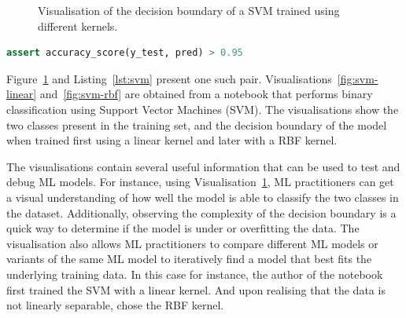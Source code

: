 \documentclass[conference]{IEEEtran}
\begin{document}
\begin{figure}
  \hfill
  \caption{Visualisation of the decision boundary of a SVM trained using different kernels.}\label{fig:svm}
\end{figure}

\begin{lstlisting}[language=Python, caption={Assertion on the accuracy of the ML model.}, label={lst:svm}]
assert accuracy_score(y_test, pred) > 0.95
\end{lstlisting}

Figure~\ref{fig:svm} and Listing~\ref{lst:svm} present one such pair. Visualisations~\ref{fig:svm-linear} and~\ref{fig:svm-rbf} are obtained from a notebook that performs binary classification using Support Vector Machines (SVM). The visualisations show the two classes present in the training set, and the decision boundary of the model when trained first using a linear kernel and later with a RBF kernel.

The visualisations contain several useful information that can be used to test and debug ML models. For instance, using Visualisation~\ref{fig:svm}, ML practitioners can get a visual understanding of how well the model is able to classify the two classes in the dataset. Additionally, observing the complexity of the decision boundary is a quick way to determine if the model is under or overfitting the data. The visualisation also allows ML practitioners to compare different ML models or variants of the same ML model to iteratively find a model that best fits the underlying training data. In this case for instance, the author of the notebook first trained the SVM with a linear kernel. And upon realising that the data is not linearly separable, chose the RBF kernel.
\end{document}
